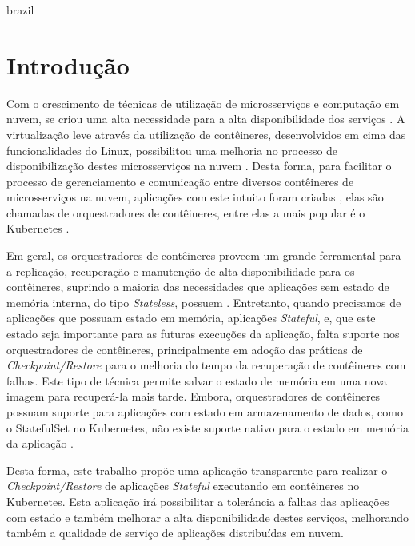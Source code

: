     \begin{otherlanguage*}{brazil}
        \setlength{\parskip}{0.2cm}
        \setlength{\parindent}{0.0cm}
        \selectfont

        \section*{Introdução}

		Com o crescimento de técnicas de utilização de microsserviços e
		computação em nuvem, se criou uma alta necessidade para a alta
		disponibilidade dos serviços \cite{vayghan2021kubernetes}. A
		virtualização leve através da utilização de contêineres, desenvolvidos
		em cima das funcionalidades do Linux, possibilitou uma melhoria no
		processo de disponibilização destes microsserviços na nuvem
		\cite{laadan2010linux}. Desta forma, para facilitar o processo de
		gerenciamento e comunicação entre diversos contêineres de microsserviços
		na nuvem, aplicações com este intuito foram criadas
		\cite{vayghan2021kubernetes}, elas são chamadas de orquestradores de
		contêineres, entre elas a mais popular é o Kubernetes \cite{kubernetes}.

		Em geral, os orquestradores de contêineres proveem um grande ferramental
		para a replicação, recuperação e manutenção de alta disponibilidade para
		os contêineres, suprindo a maioria das necessidades que aplicações sem
		estado de memória interna, do tipo \textit{Stateless}, possuem
		\cite{vayghan2021kubernetes}. Entretanto, quando precisamos de aplicações
		que possuam estado em memória, aplicações \textit{Stateful}, e, que este
		estado seja importante para as futuras execuções da aplicação, falta
		suporte nos orquestradores de contêineres, principalmente em adoção das
		práticas de \textit{Checkpoint/Restore} \cite{muller2022architecture} para
		o melhoria do tempo da recuperação de contêineres com falhas. Este tipo de
		técnica permite salvar o estado de memória em uma nova imagem para
		recuperá-la mais tarde. Embora, orquestradores de contêineres possuam
		suporte para aplicações com estado em armazenamento de dados, como o
		StatefulSet no Kubernetes, não existe suporte nativo para o estado em
		memória da aplicação \cite{tran2022proactive}.

		Desta forma, este trabalho propõe uma aplicação transparente para realizar
		o \textit{Checkpoint/Restore} de aplicações \textit{Stateful} executando em
		contêineres no Kubernetes. Esta aplicação irá possibilitar a tolerância a
		falhas das aplicações com estado e também melhorar a alta disponibilidade
		destes serviços, melhorando também a qualidade de serviço de aplicações
		distribuídas em nuvem.


\end{otherlanguage*}
